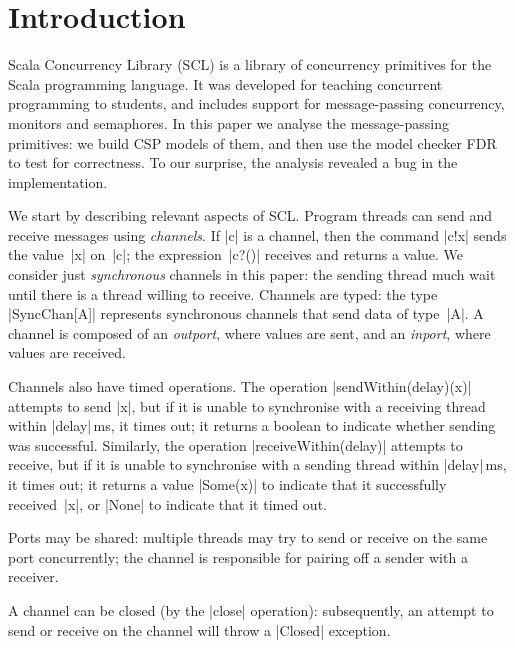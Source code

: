 \begin{abstract}
\framebox{\ldots}
\end{abstract}

\section{Introduction}

Scala Concurrency Library (SCL) is a library of concurrency primitives for the
Scala programming language.  It was developed for teaching concurrent
programming to students, and includes support for message-passing concurrency,
monitors and semaphores.  In this paper we analyse the message-passing
primitives: we build CSP models of them, and then use the model checker FDR to
test for correctness.  To our surprise, the analysis revealed a bug in the
implementation.

We start by describing relevant aspects of SCL\@.  Program threads can send
and receive messages using \emph{channels}.  If |c| is a channel, then the
command |c!x| sends the value~|x| on~|c|; the expression~|c?()| receives and
returns a value.  We consider just \emph{synchronous} channels in this paper:
the sending thread much wait until there is a thread willing to receive.
Channels are typed: the type |SyncChan[A]| represents synchronous channels
that send data of type~|A|.  A channel is composed of an \emph{outport}, where
values are sent, and an \emph{inport}, where values are received.

Channels also have timed operations.  The operation |sendWithin(delay)(x)|
attempts to send |x|, but if it is unable to synchronise with a receiving
thread within |delay|\,ms, it times out; it returns a boolean to indicate
whether sending was successful.  Similarly, the operation
|receiveWithin(delay)| attempts to receive, but if it is unable to synchronise
with a sending thread within |delay|\,ms, it times out; it returns a value
|Some(x)| to indicate that it successfully received~|x|, or |None| to indicate
that it timed out.

Ports may be shared: multiple threads may try to send or receive on the same
port concurrently; the channel is responsible for pairing off a sender with a
receiver. 

A channel can be closed (by the |close| operation): subsequently, an attempt
to send or receive on the channel will throw a |Closed| exception.

